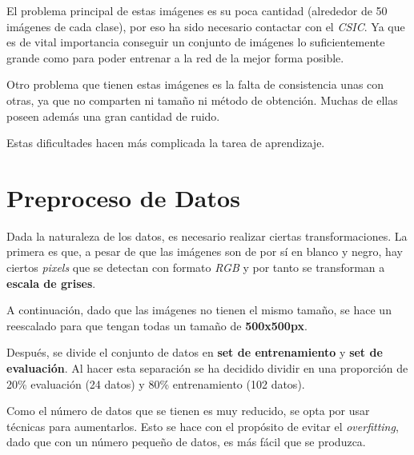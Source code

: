 \documentclass{uc3mpracticas}
\begin{document}
  \vspace{4mm}

  El problema principal de estas imágenes es su poca cantidad (alrededor de 50 imágenes de cada clase), por eso ha sido necesario contactar con el \textit{CSIC}. Ya que es de vital importancia conseguir un conjunto de imágenes lo suficientemente grande como para poder entrenar a la red de la mejor forma posible.

  \vspace{2mm}

  Otro problema que tienen estas imágenes es la falta de consistencia unas con otras, ya que no comparten ni tamaño ni método de obtención. Muchas de ellas poseen además una gran cantidad de ruido.

  \vspace{2mm}

  Estas dificultades hacen más complicada la tarea de aprendizaje.



  \section{Preproceso de Datos}

  Dada la naturaleza de los datos, es necesario realizar ciertas transformaciones. La primera es que, a pesar de que las imágenes son de por sí en blanco y negro, hay ciertos \textit{pixels} que se detectan con formato \textit{RGB} y por tanto se transforman a \textbf{escala de grises}.

  \vspace{2mm}

  A continuación, dado que las imágenes no tienen el mismo tamaño, se hace un reescalado para que tengan todas un tamaño de \textbf{500x500px}.

  \vspace{2mm}

  Después, se divide el conjunto de datos en \textbf{set de entrenamiento} y \textbf{set de evaluación}. Al hacer esta separación se ha decidido dividir en una proporción de 20\% evaluación (24 datos) y 80\% entrenamiento (102 datos).

  \vspace{2mm}

  Como el número de datos que se tienen es muy reducido, se opta por usar técnicas para aumentarlos. Esto se hace con el propósito de evitar el \textit{overfitting}, dado que con un número pequeño de datos, es más fácil que se produzca.
\end{document}
